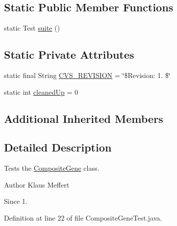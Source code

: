 \subsection*{Static Public Member Functions}
\begin{DoxyCompactItemize}
\item 
static Test \hyperlink{classorg_1_1jgap_1_1impl_1_1_composite_gene_test_adaa2ab208be14dcdd6ea05a69c784e31}{suite} ()
\end{DoxyCompactItemize}
\subsection*{Static Private Attributes}
\begin{DoxyCompactItemize}
\item 
static final String \hyperlink{classorg_1_1jgap_1_1impl_1_1_composite_gene_test_a6c9038f49a9e63b96a7d6c41f6ec8b72}{C\-V\-S\-\_\-\-R\-E\-V\-I\-S\-I\-O\-N} = \char`\"{}\$Revision\-: 1. \$\char`\"{}
\item 
static int \hyperlink{classorg_1_1jgap_1_1impl_1_1_composite_gene_test_a0cd6b81e91fa16b4450b386ed86aa3c0}{cleaned\-Up} = 0
\end{DoxyCompactItemize}
\subsection*{Additional Inherited Members}


\subsection{Detailed Description}
Tests the \hyperlink{classorg_1_1jgap_1_1impl_1_1_composite_gene}{Composite\-Gene} class.

\begin{DoxyAuthor}{Author}
Klaus Meffert 
\end{DoxyAuthor}
\begin{DoxySince}{Since}
1. 
\end{DoxySince}


Definition at line 22 of file Composite\-Gene\-Test.\-java.



